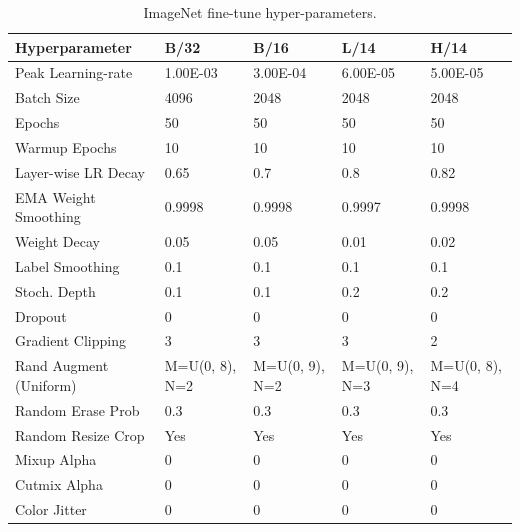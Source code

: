 \begin{appendix}
\begin{table}
\footnotesize
\centering
{}
\begin{tabular}{lllll}
\toprule
        Hyperparameter &                B/32 &                B/16 &                L/14 &                H/14 \\
\midrule
    Peak Learning-rate &            1.00E-03 &            3.00E-04 &            6.00E-05 &            5.00E-05 \\
            Batch Size &                4096 &                2048 &                2048 &                2048 \\
                Epochs &                  50 &                  50 &                  50 &                  50 \\
         Warmup Epochs &                  10 &                  10 &                  10 &                  10 \\
   Layer-wise LR Decay &                0.65 &                 0.7 &                 0.8 &                0.82 \\
  EMA Weight Smoothing &              0.9998 &              0.9998 &              0.9997 &              0.9998 \\
          Weight Decay &                0.05 &                0.05 &                0.01 &                0.02 \\
       Label Smoothing &                 0.1 &                 0.1 &                 0.1 &                 0.1 \\
          Stoch. Depth &                 0.1 &                 0.1 &                 0.2 &                 0.2 \\
               Dropout &                   0 &                   0 &                   0 &                   0 \\
     Gradient Clipping &                   3 &                   3 &                   3 &                   2 \\
Rand Augment (Uniform) &      M=U(0, 8), N=2 &      M=U(0, 9), N=2 &      M=U(0, 9), N=3 &     M=U(0, 8), N=4  \\
     Random Erase Prob &                 0.3 &                 0.3 &                 0.3 &                 0.3 \\
     Random Resize Crop &                 Yes &                 Yes &                 Yes &                Yes \\
           Mixup Alpha &                   0 &                   0 &                   0 &                   0 \\
          Cutmix Alpha &                   0 &                   0 &                   0 &                   0 \\
          Color Jitter &                   0 &                   0 &                   0 &                   0 \\
\bottomrule
\end{tabular}
\caption{ImageNet fine-tune hyper-parameters.}
\label{table:imagenet_ft_hparam}
\end{table}


\end{appendix}
